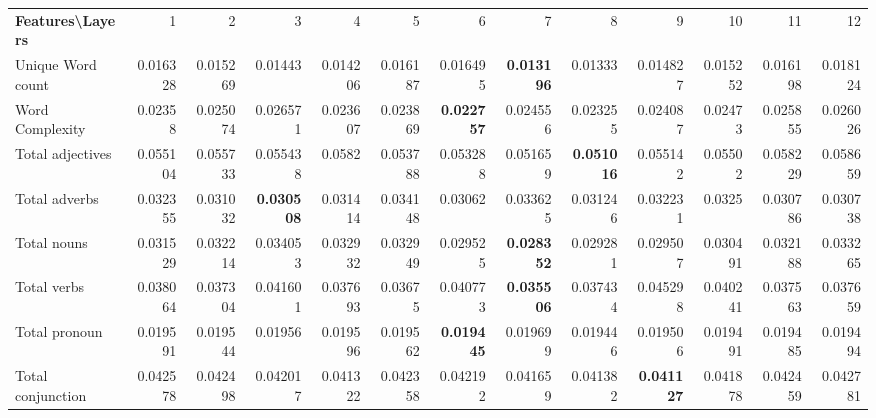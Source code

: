 \documentclass[sigconf]{acmart}
\begin{document}
\begin{table*}[]
\begin{adjustbox}{width=1\textwidth}
\begin{tabular}{@{}l|rrrrrrrrrrrr@{}}
\toprule
\textbf{Features\textbackslash{}Layers} & 1        & 2        & 3                 & 4        & 5        & 6                 & 7                 & 8                 & 9                 & 10       & 11       & 12       \\
Unique Word count                       & 0.016328 & 0.015269 & 0.01443           & 0.014206 & 0.016187 & 0.016495          & \textbf{0.013196} & 0.01333           & 0.014827          & 0.015252 & 0.016198 & 0.018124 \\
Word Complexity                         & 0.02358  & 0.025074 & 0.026571          & 0.023607 & 0.023869 & \textbf{0.022757} & 0.024556          & 0.023255          & 0.024087          & 0.02473  & 0.025855 & 0.026026 \\
Total adjectives                        & 0.055104 & 0.055733 & 0.055438          & 0.0582   & 0.053788 & 0.053288          & 0.051659          & \textbf{0.051016} & 0.055142          & 0.05502  & 0.058229 & 0.058659 \\
Total adverbs                           & 0.032355 & 0.031032 & \textbf{0.030508} & 0.031414 & 0.034148 & 0.03062           & 0.033625          & 0.031246          & 0.032231          & 0.0325   & 0.030786 & 0.030738 \\
Total nouns                             & 0.031529 & 0.032214 & 0.034053          & 0.032932 & 0.032949 & 0.029525          & \textbf{0.028352} & 0.029281          & 0.029507          & 0.030491 & 0.032188 & 0.033265 \\
Total verbs                             & 0.038064 & 0.037304 & 0.041601          & 0.037693 & 0.03675  & 0.040773          & \textbf{0.035506} & 0.037434          & 0.045298          & 0.040241 & 0.037563 & 0.037659 \\
Total pronoun                           & 0.019591 & 0.019544 & 0.01956           & 0.019596 & 0.019562 & \textbf{0.019445} & 0.019699          & 0.019446          & 0.019506          & 0.019491 & 0.019485 & 0.019494 \\
Total conjunction                       & 0.042578 & 0.042498 & 0.042017          & 0.041322 & 0.042358 & 0.042192          & 0.041659          & 0.041382          & \textbf{0.041127} & 0.041878 & 0.042459 & 0.042781 \\

\end{tabular}
\end{adjustbox}
\end{table*}
\end{document}
